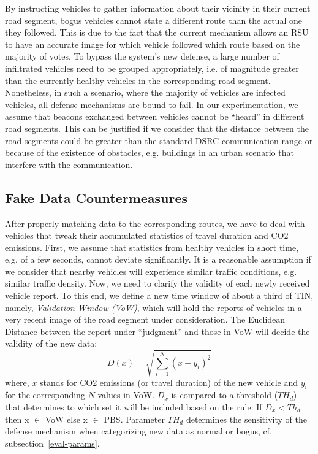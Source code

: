 \documentclass[conference]{IEEEtran}
\begin{document}
By instructing vehicles to gather information about their vicinity in their current road segment, bogus vehicles cannot state a different route than the actual one 
they followed. This is due to the fact that the current mechanism allows an RSU to have an accurate image for which vehicle followed which route based on the majority 
of votes. To bypass the system's new defense,  a large number of infiltrated vehicles need to be grouped appropriately, i.e. of magnitude greater than
the currently healthy vehicles in the corresponding road segment. Nonetheless, in such a scenario, where the majority of vehicles are infected vehicles,
all defense mechanisms are bound to fail.  In our experimentation, we assume that beacons exchanged between vehicles cannot be ``heard'' in different road 
segments. This can be justified if we consider that the distance between the road segments could be greater than the standard DSRC communication range or because of the existence of obstacles, e.g. buildings in an urban scenario that interfere with the communication.  
 

\begin{comment}
\begin{figure}[!htb]
  \centering
     \texttt{[image: ErouVe\_Diagram.pdf]}
  \caption{caption}
  \label{erouve_diagram}
\end{figure}
\end{comment}








\subsection{Fake Data Countermeasures}

After properly matching data to the corresponding routes, we have to deal with vehicles that tweak their accumulated statistics of travel duration 
and CO2 emissions. First, we assume that statistics from healthy vehicles in short time, e.g. of a few seconds, cannot deviate significantly. It is a reasonable assumption 
if we consider that nearby vehicles will experience similar traffic conditions, e.g. similar traffic density. Now, we need to clarify the validity of each newly received vehicle report.
To this end, we define a new time window of about a third of TIN, namely, {\it Validation Window (VoW)}, which will hold the reports of vehicles in a very recent image of  
the road segment under consideration. The Euclidean Distance between the report under ``judgment'' and those in VoW will decide the validity of the new data:
\begin{equation}
D(x) = \sqrt {\sum_{i=1}^{N}(x-y_i)^2}
\end{equation}
where, $x$ stands for  CO2 emissions (or travel duration) of the new vehicle and $y_i$ for the corresponding $N$ values in VoW.
$D_{x}$ is compared to a threshold ($TH_{d}$) that determines to which set it will be included based on the rule:
If $D_{x} < Th_{d}$ then x $\in$ VoW else x $\in$ PBS. Parameter $TH_{d}$ determines the sensitivity of the defense mechanism when categorizing new data as normal or bogus, cf. subsection~\ref{eval-params}. 
\end{document}
